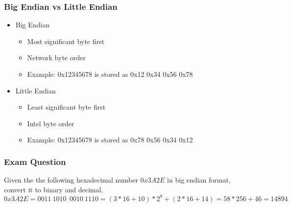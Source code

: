 \begin{frame}
    \frametitle{Big Endian vs Little Endian}
    \begin{itemize}
        \item Big Endian
        \begin{itemize}
            \item Most significant byte first
            \item Network byte order
            \item Example: 0x12345678 is stored as 0x12 0x34 0x56 0x78
        \end{itemize}
        \item Little Endian
        \begin{itemize}
            \item Least significant byte first
            \item Intel byte order
            \item Example: 0x12345678 is stored as 0x78 0x56 0x34 0x12
        \end{itemize}
    \end{itemize}
\end{frame}




\begin{frame}
    \frametitle{Exam Question}
    Given the the following hexadecimal number $0x3A2E$ in big endian format, convert it to binary and decimal.
    $0x3A2E = 0011\ 1010\ \ 0010\ 1110 = (3 * 16 + 10) * 2^8 + (2 * 16 + 14) = 58 * 256 + 46 = 14894$
\end{frame}